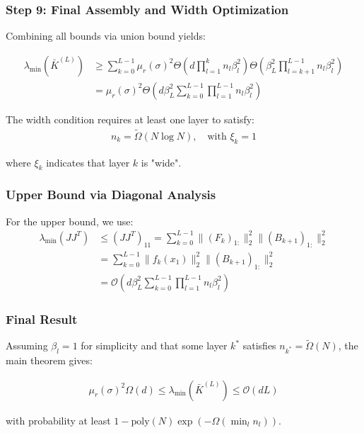 \documentclass{article}
\newcommand{\evmin}[1]{\lambda_{\min}\left(#1\right)}
\begin{document}
\subsubsection{Step 9: Final Assembly and Width Optimization}

Combining all bounds via union bound yields:

\begin{align}
\evmin{\bar{K}^{(L)}} &\geq \sum_{k=0}^{L-1} \mu_r(\sigma)^2 \Theta\left(d \prod_{l=1}^k n_l \beta_l^2\right) \Theta\left(\beta_L^2 \prod_{l=k+1}^{L-1} n_l \beta_l^2\right) \\
&= \mu_r(\sigma)^2 \Theta\left(d \beta_L^2 \sum_{k=0}^{L-1} \prod_{l=1}^{L-1} n_l \beta_l^2\right)
\end{align}

The width condition requires at least one layer to satisfy:
\begin{align}
n_k = \tilde{\Omega}(N \log N), \quad \text{with } \xi_k = 1
\end{align}

where $\xi_k$ indicates that layer $k$ is "wide".

\subsubsection{Upper Bound via Diagonal Analysis}

For the upper bound, we use:
\begin{align}
\evmin{JJ^T} &\leq (JJ^T)_{11} = \sum_{k=0}^{L-1} \|(F_k)_{1:}\|_2^2 \|(B_{k+1})_{1:}\|_2^2 \\
&= \sum_{k=0}^{L-1} \|f_k(x_1)\|_2^2 \|(B_{k+1})_{1:}\|_2^2 \\
&= \mathcal{O}\left(d \beta_L^2 \sum_{k=0}^{L-1} \prod_{l=1}^{L-1} n_l \beta_l^2\right)
\end{align}

\subsubsection{Final Result}

Assuming $\beta_l = 1$ for simplicity and that some layer $k^*$ satisfies $n_{k^*} = \tilde{\Omega}(N)$, the main theorem gives:

\begin{align}
\mu_r(\sigma)^2 \Omega(d) \leq \evmin{\bar{K}^{(L)}} \leq \mathcal{O}(d L)
\end{align}

with probability at least $1 - \text{poly}(N) \exp(-\Omega(\min_l n_l))$.
\end{document}
